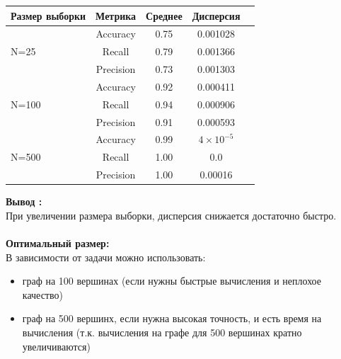 \begin{table}[h]
    \centering
    \begin{tabular}{lcccc}
    \toprule
    \textbf{Размер выборки} & \textbf{Метрика} & \textbf{Среднее} & \textbf{Дисперсия} \\
    \midrule
    \multirow{3}{*}{N=25} 
     & Accuracy & 0.75 & 0.001028 \\
     & Recall   & 0.79 & 0.001366 \\
     & Precision & 0.73 & 0.001303 \\
    \midrule
    \multirow{3}{*}{N=100}
     & Accuracy & 0.92 & 0.000411 \\
     & Recall   & 0.94 & 0.000906 \\
     & Precision & 0.91 & 0.000593 \\
    \midrule
    \multirow{3}{*}{N=500}
     & Accuracy & 0.99 & $4 \times 10^{-5}$ \\
     & Recall   & 1.00 & 0.0 \\
     & Precision & 1.00 & 0.00016 \\
    \bottomrule
    \end{tabular}
\end{table}
\newpage
\noindent \textbf{Вывод :}\\
При увеличении размера выборки, дисперсия снижается достаточно быстро.\\
\\
\textbf{Оптимальный размер:} \\
В зависимости от задачи можно использовать:
\begin{itemize}
    \item граф на 100 вершинах (если нужны быстрые вычисления и неплохое качество) 

    \item граф на 500 вершинх, если нужна высокая точность, и есть время на вычисления (т.к. вычисления на графе для 500 вершинах кратно увеличиваются)

\end{itemize}

\restoregeometry